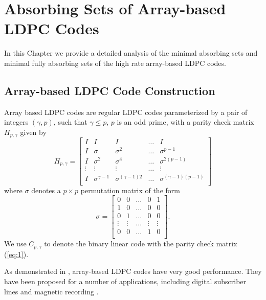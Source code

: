 \chapter[Absorbing Sets of Array-based LDPC Codes]{Absorbing Sets of Array-based LDPC
Codes}\label{arrayabs}

In this Chapter we provide a detailed analysis of the  minimal
absorbing sets and minimal fully absorbing sets of the high rate
array-based LDPC codes.

\section{Array-based LDPC Code Construction}

Array based LDPC codes \cite{fan} are regular LDPC codes
parameterized by a pair of integers $(\gamma, p)$, such that
$\gamma \leq p$, $p$ is an odd prime, with a parity check matrix
$H_{p,\gamma}$ given by
\begin{equation}\label{eq:1}
H_{p,\gamma}=\left[\begin{array}{ccccc}
I & I & I & \ldots & I\\
I & \sigma & \sigma^2 & \ldots &\sigma^{p-1}\\
I & \sigma^2 & \sigma^4 & \ldots &\sigma^{2(p-1)}\\
\vdots & \vdots & \vdots & \ldots & \vdots \\
I & \sigma^{\gamma-1} & \sigma^{(\gamma-1)2} & \ldots &\sigma^{(\gamma-1)(p-1)}\\
\end{array}
\right]
\end{equation}\normalsize
where $\sigma$ denotes a $p \times p$ permutation matrix of the
form \small
\begin{equation}
\sigma=\left[\begin{array}{ccccc}
0 & 0 & \ldots & 0 & 1\\
1 & 0 & \ldots & 0 & 0\\
0 & 1 & \ldots & 0 & 0\\
\vdots & \vdots & \ldots & \vdots & \vdots\\
0 & 0 & \ldots & 1 & 0\\
\end{array}
\right].
\end{equation}
\normalsize We use $C_{p,\gamma}$ to denote the binary linear code
with the parity check matrix (\ref{eq:1}).

As demonstrated in \cite{fan}, array-based LDPC codes have very
good performance. They have been proposed for a number of
applications, including digital subscriber lines \cite{ibm:02} and
magnetic recording  \cite{vasic:05}.




